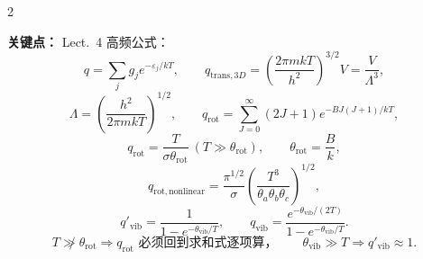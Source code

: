 \documentclass[a4paper,9pt]{article}
\newenvironment{keypoint}
{\par\vspace{0.3em}\noindent\begin{tcolorbox}[
  colback=keybg,
  colframe=keycolor,
  boxrule=0.5pt,
  arc=2pt,
  left=2pt,
  right=2pt,
  top=2pt,
  bottom=2pt,
  boxsep=0pt,
  ]
\noindent\textcolor{keycolor}{\textbf{关键点：}}}
{\end{tcolorbox}\par\vspace{0.3em}}
\begin{document}
\begin{multicols}{2}
	\begin{keypoint}
		Lect.~4 高频公式：
		\[
			q=\sum_j g_j e^{-\varepsilon_j/kT},
			\qquad
			q_{\mathrm{trans},3D}=\left(\frac{2\pi mkT}{h^2}\right)^{3/2}V=\frac{V}{\Lambda^3},
		\]
		\[
			\Lambda=\left(\frac{h^2}{2\pi mkT}\right)^{1/2},
			\qquad
			q_{\mathrm{rot}}=\sum_{J=0}^{\infty}(2J+1)e^{-BJ(J+1)/kT},
		\]
		\[
			q_{\mathrm{rot}}=\frac{T}{\sigma\theta_{\mathrm{rot}}}\ (T\gg\theta_{\mathrm{rot}}),
			\qquad
			\theta_{\mathrm{rot}}=\frac{B}{k},
		\]
		\[
			q_{\mathrm{rot,nonlinear}}=\frac{\pi^{1/2}}{\sigma}
			\left(\frac{T^3}{\theta_a\theta_b\theta_c}\right)^{1/2},
		\]
		\[
			q'_{\mathrm{vib}}=\frac{1}{1-e^{-\theta_{\mathrm{vib}}/T}},
			\qquad
			q_{\mathrm{vib}}=\frac{e^{-\theta_{\mathrm{vib}}/(2T)}}{1-e^{-\theta_{\mathrm{vib}}/T}}.
		\]
		\[
			T\not\gg \theta_{\mathrm{rot}}\Rightarrow q_{\mathrm{rot}}\text{ 必须回到求和式逐项算，}
			\qquad
			\theta_{\mathrm{vib}}\gg T\Rightarrow q'_{\mathrm{vib}}\approx 1.
		\]
	\end{keypoint}

\end{multicols}
\end{document}
